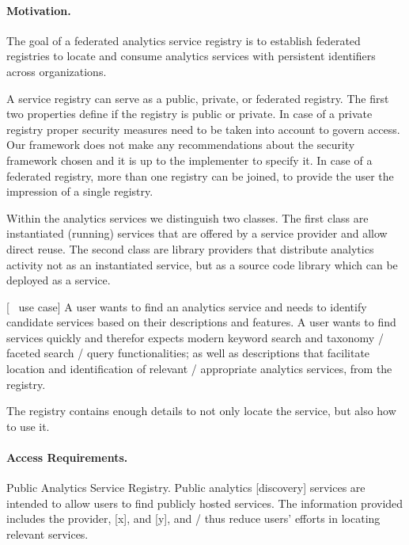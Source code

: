 \documentclass[12pt]{article}
\begin{document}

\paragraph{Motivation.} 
The goal of a federated analytics service registry is to establish federated registries to locate and consume analytics services with persistent identifiers across organizations. 

A service registry can serve as a public, private, or federated registry. The first two properties define if the registry is public or private. In case of a private registry proper security measures need to be taken into account to govern access. Our framework does not make any recommendations about the security framework chosen and it is up to the implementer to specify it. In case of a federated registry, more than one registry can be joined, to provide the user the impression of a single registry.

Within the analytics services we distinguish two classes. The first class are instantiated (running) services that are offered by a service provider and allow direct reuse. The second class are library providers that distribute analytics activity not as an instantiated service, but as a source code library which can be deployed as a service. 


[~ use case] A user wants to find an analytics service and needs to identify candidate services based on their descriptions and features. A user wants to find services quickly and therefor expects modern keyword search and taxonomy / faceted search / query functionalities; as well as descriptions that facilitate location and identification of relevant /  appropriate analytics services, from the registry.

The registry contains enough details to not only locate the service, but also how to use it.

\paragraph{Access Requirements.} 


Public Analytics Service Registry. Public analytics [discovery] services are intended to allow users to find publicly hosted services. The information provided includes the provider, [x], and [y], and / thus reduce users' efforts in locating relevant services.
\end{document}
